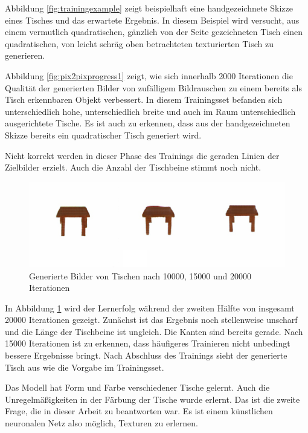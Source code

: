 Abbildung \ref{fig:trainingexample} zeigt beispielhaft eine handgezeichnete Skizze eines Tisches und das erwartete Ergebnis. In diesem Beispiel wird versucht, aus einem vermutlich quadratischen, gänzlich von der Seite gezeichneten Tisch einen quadratischen, von leicht schräg oben betrachteten texturierten Tisch zu generieren.

Abbildung \ref{fig:pix2pixprogress1} zeigt, wie sich innerhalb 2000 Iterationen die Qualität der generierten Bilder von zufälligem Bildrauschen zu einem bereits als Tisch erkennbaren Objekt verbessert. In diesem Trainingsset befanden sich unterschiedlich hohe, unterschiedlich breite und auch im Raum unterschiedlich ausgerichtete Tische. Es ist auch zu erkennen, dass aus der handgezeichneten Skizze bereits ein quadratischer Tisch generiert wird.

Nicht korrekt werden in dieser Phase des Trainings die geraden Linien der Zielbilder erzielt. Auch die Anzahl der Tischbeine stimmt noch nicht.

\begin{figure}[h]
	\centering
	\includegraphics[width=1.0\textwidth]{bilder/pix2pix_progress/progress_tables2.png}
	\caption[Lernfortschritt am Beispiel von Tischen 2]{Generierte Bilder von Tischen nach 10000, 15000 und 20000 Iterationen}
	\label{fig:pix2pixprogress2}
\end{figure}

In Abbildung \ref{fig:pix2pixprogress2} wird der Lernerfolg während der zweiten Hälfte von insgesamt 20000 Iterationen gezeigt. Zunächst ist das Ergebnis noch stellenweise unscharf und die Länge der Tischbeine ist ungleich. Die Kanten sind bereits gerade. Nach 15000 Iterationen ist zu erkennen, dass häufigeres Trainieren nicht unbedingt bessere Ergebnisse bringt. Nach Abschluss des Trainings sieht der generierte Tisch aus wie die Vorgabe im Trainingsset.

Das Modell hat Form und Farbe verschiedener Tische gelernt. Auch die Unregelmäßigkeiten in der Färbung der Tische wurde erlernt. Das ist die zweite Frage, die in dieser Arbeit zu beantworten war. Es ist einem künstlichen neuronalen Netz also möglich, Texturen zu erlernen.

